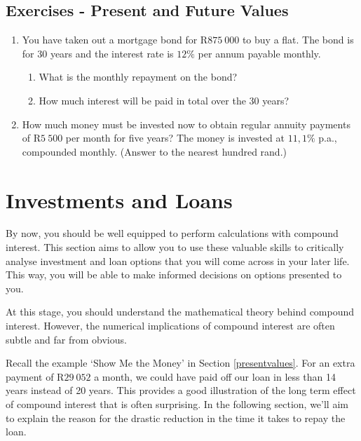 
\subsection{Exercises - Present and Future Values}
\begin{enumerate}
\item{You have taken out a mortgage bond for R$875~000$ to buy a flat. The bond is for 30 years and the interest rate is $12\%$ per annum payable monthly.
\begin{enumerate}
\item What is the monthly repayment on the bond?
\item How much interest will be paid in total over the 30 years?
\end{enumerate}}
\item{How much money must be invested now to obtain regular annuity payments of R$5~500$ per month for five years?  The money is invested at $11,1\%$ p.a., compounded monthly. (Answer to the nearest hundred rand.)}
\end{enumerate}

\section{Investments and Loans}
\label{s:investmentandloans}

By now, you should be well equipped to perform calculations with compound interest. This section aims to allow you to use these valuable skills to critically analyse investment and loan options that you will come across in your later life. This way, you will be able to make informed decisions on options presented to you.

At this stage, you should understand the mathematical theory behind compound interest. However, the numerical implications of compound interest are often subtle and far from obvious.

Recall the example `Show Me the Money' in Section \ref{presentvalues}. For an extra payment of R$29~052$ a month, we could have paid off our loan in less than 14 years instead of 20 years. This provides a good illustration of the long term effect of compound interest that is often surprising. In the following section, we'll aim to explain the reason for the drastic reduction in the time it takes to repay the loan.

